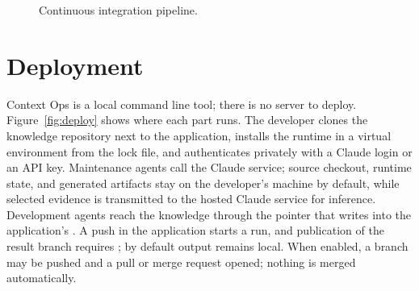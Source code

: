 \begin{figure}[htbp]
\centering
{}
\caption{Continuous integration pipeline.}
\label{fig:ci}
\end{figure}

\section{Deployment}

Context Ops is a local command line tool; there is no server to deploy. Figure~\ref{fig:deploy} shows where each part runs. The developer clones the knowledge repository next to the application, installs the runtime in a virtual environment from the lock file, and authenticates privately with a Claude login or an API key. Maintenance agents call the Claude service; source checkout, runtime state, and generated artifacts stay on the developer's machine by default, while selected evidence is transmitted to the hosted Claude service for inference. Development agents reach the knowledge through the pointer that  writes into the application's . A push in the application starts a run, and publication of the result branch requires ; by default output remains local. When enabled, a branch may be pushed and a pull or merge request opened; nothing is merged automatically.

